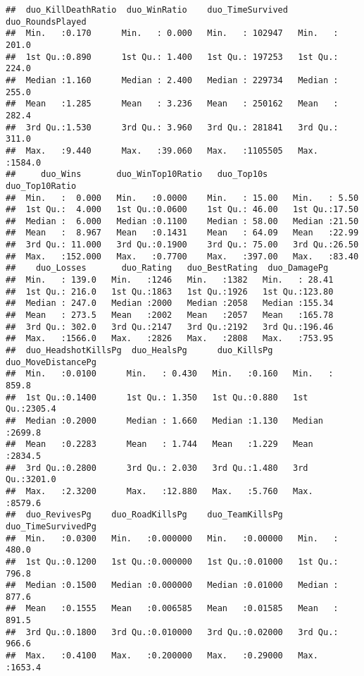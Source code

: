 \documentclass[]{article}
\begin{document}
\begin{verbatim}
##  duo_KillDeathRatio  duo_WinRatio    duo_TimeSurvived  duo_RoundsPlayed
##  Min.   :0.170      Min.   : 0.000   Min.   : 102947   Min.   : 201.0  
##  1st Qu.:0.890      1st Qu.: 1.400   1st Qu.: 197253   1st Qu.: 224.0  
##  Median :1.160      Median : 2.400   Median : 229734   Median : 255.0  
##  Mean   :1.285      Mean   : 3.236   Mean   : 250162   Mean   : 282.4  
##  3rd Qu.:1.530      3rd Qu.: 3.960   3rd Qu.: 281841   3rd Qu.: 311.0  
##  Max.   :9.440      Max.   :39.060   Max.   :1105505   Max.   :1584.0  
##     duo_Wins       duo_WinTop10Ratio   duo_Top10s     duo_Top10Ratio 
##  Min.   :  0.000   Min.   :0.0000    Min.   : 15.00   Min.   : 5.50  
##  1st Qu.:  4.000   1st Qu.:0.0600    1st Qu.: 46.00   1st Qu.:17.50  
##  Median :  6.000   Median :0.1100    Median : 58.00   Median :21.50  
##  Mean   :  8.967   Mean   :0.1431    Mean   : 64.09   Mean   :22.99  
##  3rd Qu.: 11.000   3rd Qu.:0.1900    3rd Qu.: 75.00   3rd Qu.:26.50  
##  Max.   :152.000   Max.   :0.7700    Max.   :397.00   Max.   :83.40  
##    duo_Losses       duo_Rating   duo_BestRating  duo_DamagePg   
##  Min.   : 139.0   Min.   :1246   Min.   :1382   Min.   : 28.41  
##  1st Qu.: 216.0   1st Qu.:1863   1st Qu.:1926   1st Qu.:123.80  
##  Median : 247.0   Median :2000   Median :2058   Median :155.34  
##  Mean   : 273.5   Mean   :2002   Mean   :2057   Mean   :165.78  
##  3rd Qu.: 302.0   3rd Qu.:2147   3rd Qu.:2192   3rd Qu.:196.46  
##  Max.   :1566.0   Max.   :2826   Max.   :2808   Max.   :753.95  
##  duo_HeadshotKillsPg  duo_HealsPg      duo_KillsPg    duo_MoveDistancePg
##  Min.   :0.0100      Min.   : 0.430   Min.   :0.160   Min.   : 859.8    
##  1st Qu.:0.1400      1st Qu.: 1.350   1st Qu.:0.880   1st Qu.:2305.4    
##  Median :0.2000      Median : 1.660   Median :1.130   Median :2699.8    
##  Mean   :0.2283      Mean   : 1.744   Mean   :1.229   Mean   :2834.5    
##  3rd Qu.:0.2800      3rd Qu.: 2.030   3rd Qu.:1.480   3rd Qu.:3201.0    
##  Max.   :2.3200      Max.   :12.880   Max.   :5.760   Max.   :8579.6    
##  duo_RevivesPg    duo_RoadKillsPg    duo_TeamKillsPg   duo_TimeSurvivedPg
##  Min.   :0.0300   Min.   :0.000000   Min.   :0.00000   Min.   : 480.0    
##  1st Qu.:0.1200   1st Qu.:0.000000   1st Qu.:0.01000   1st Qu.: 796.8    
##  Median :0.1500   Median :0.000000   Median :0.01000   Median : 877.6    
##  Mean   :0.1555   Mean   :0.006585   Mean   :0.01585   Mean   : 891.5    
##  3rd Qu.:0.1800   3rd Qu.:0.010000   3rd Qu.:0.02000   3rd Qu.: 966.6    
##  Max.   :0.4100   Max.   :0.200000   Max.   :0.29000   Max.   :1653.4    

\end{verbatim}
\end{document}
